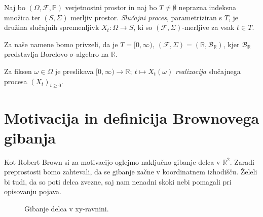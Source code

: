 \documentclass[twoside,11pt]{article}
\begin{document}
\begin{definicija}
    Naj bo $(\Omega, \mathcal{F}, \mathbb{P})$ verjetnostni prostor in naj bo $T\neq\emptyset$ neprazna
    indeksna množica ter $(S, \Sigma)$ merljiv prostor. \textit{Slučajni proces}, parametriziran
    s $T$, je družina slučajnih spremenljivk $X_t : \Omega \to S$, ki so $(\mathcal{F}, \Sigma)$-merljive
    za vsak $t \in T$.
\end{definicija}

\begin{opomba}
    Za naše namene bomo privzeli, da je $T = [0, \infty), \ (\mathcal{F}, \Sigma) = (\mathbb{R}, \mathcal{B}_{\mathbb{R}})$,
    kjer $\mathcal{B}_{\mathbb{R}}$ predstavlja Borelovo $\sigma$-algebro na $\mathbb{R}$. 
\end{opomba}
    
\begin{definicija}
    Za fiksen $\omega \in \Omega$ je preslikava 
    $[0, \infty) \rightarrow \mathbb{R}; \ t \mapsto X_t(\omega)$ 
    \textit{realizacija} slučajnega procesa $(X_t)_{t\geq0}$.
\end{definicija}


\pagebreak

\section{Motivacija in definicija Brownovega gibanja}

Kot Robert Brown si za motivacijo oglejmo naključno gibanje delca v $\mathbb{R}^2$.
Zaradi preprostosti bomo zahtevali, da se gibanje začne v koordinatnem izhodišču. Želeli bi tudi, da so 
poti delca zvezne, saj nam nenadni skoki nebi pomagali pri opisovanju pojava.  

\begin{figure}[h]
    \centering

    \caption{Gibanje delca v xy-ravnini.}
    \label{fig:slika1}
\end{figure}
\end{document}
